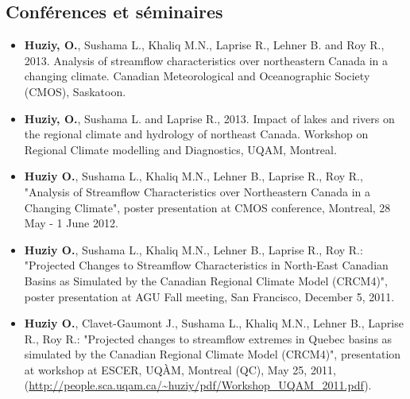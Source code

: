 \documentclass[12pt,a4paper,sans]{moderncv} %
\begin{document}
\subsection{Conférences et séminaires}
\vspace{0.5cm}
\begin{itemize}
  
   \item \textbf{Huziy, O.}, Sushama L., Khaliq M.N., Laprise R., Lehner B. and
   Roy R., 2013. Analysis of streamflow characteristics over northeastern
   Canada in a changing climate. Canadian Meteorological and Oceanographic Society (CMOS), Saskatoon.
   
   \item \textbf{Huziy, O.}, Sushama L. and Laprise R., 2013. Impact of lakes
   and rivers on the regional climate and hydrology of northeast Canada. Workshop on Regional Climate modelling and Diagnostics, UQAM, Montreal.
  
  
    \item \textbf{Huziy O.}, Sushama L., Khaliq M.N., Lehner B., Laprise R., Roy
    R., "Analysis of Streamflow Characteristics over Northeastern Canada in a Changing Climate", poster presentation at CMOS conference, Montreal,
     28 May - 1 June 2012.
     
    \item \textbf{Huziy O.}, Sushama L., Khaliq M.N., Lehner B., Laprise R.,
    Roy R.: "Projected Changes to Streamflow Characteristics in North-East
    Canadian Basins as Simulated by the Canadian Regional Climate Model (CRCM4)", poster presentation at AGU Fall meeting, San Francisco,
    December 5, 2011.
    
    \item \textbf{Huziy O.}, Clavet-Gaumont J., Sushama L., Khaliq M.N.,
    Lehner B., Laprise R., Roy R.: "Projected changes to streamflow extremes
    in Quebec basins as simulated by the Canadian Regional Climate Model (CRCM4)", presentation at workshop at ESCER, UQÀM, Montreal (QC), May 25, 2011,
    (\url{http://people.sca.uqam.ca/~huziy/pdf/Workshop_UQAM_2011.pdf}). 
\end{itemize}


\vspace{0.5cm}
\end{document}
